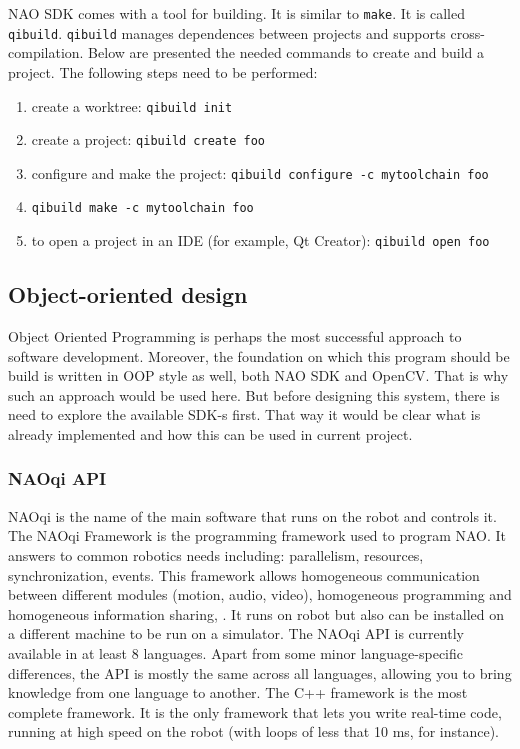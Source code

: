             NAO SDK comes with a tool for building. It is similar to \verb|make|. It is called \verb|qibuild|. \verb|qibuild| manages dependences between projects and supports cross-compilation. Below are presented the needed commands to create and build a project. The following steps need to be performed:
            \begin{enumerate}[topsep=2pt, partopsep=0pt,itemsep=0pt,parsep=1pt]
                \item create a worktree: \verb|qibuild init|
                \item create a project: \verb|qibuild create foo|
                \item configure and make the project: \verb|qibuild configure -c mytoolchain foo|
                \item        \verb|qibuild make -c mytoolchain foo|
                \item to open a project in an IDE (for example, Qt Creator): \verb|qibuild open foo|
            \end{enumerate}


        \subsection{Object-oriented design}

        Object Oriented Programming is perhaps the most successful approach to software development. Moreover, the foundation on which this program should be build is written in OOP style as well, both NAO SDK and OpenCV. That is why such an approach would be used here. But before designing this system, there is need to explore the available SDK-s first. That way it would be clear what is already implemented and how this can be used in current project.

    \subsubsection{NAOqi API}

        NAOqi is the name of the main software that runs on the robot and controls it. The NAOqi Framework is the programming framework used to program NAO. It answers to common robotics needs including: parallelism, resources, synchronization, events. This framework allows homogeneous communication between different modules (motion, audio, video), homogeneous programming and homogeneous information sharing, \cite{naoDocumentation}. It runs on robot but also can be installed on a different machine to be run on a simulator. The NAOqi API is currently available in at least 8 languages. Apart from some minor language-specific differences, the API is mostly the same across all languages, allowing you to bring knowledge from one language to another. The C++ framework is the most complete framework. It is the only framework that lets you write real-time code, running at high speed on the robot (with loops of less that 10 ms, for instance).

